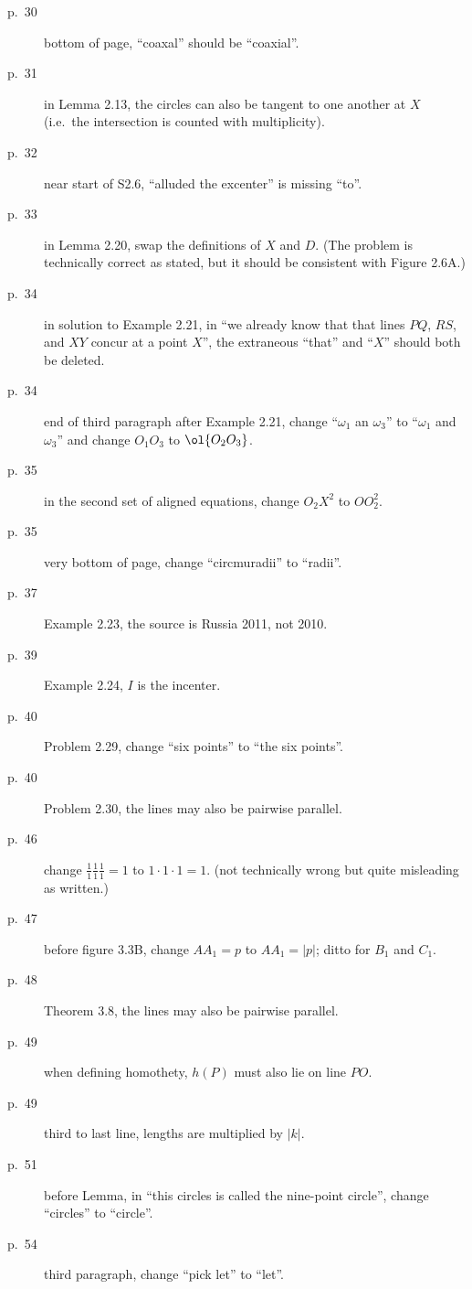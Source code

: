 \documentclass[11pt]{scrartcl}
\begin{document}
\begin{description}
\item[p.\  30] bottom of page, ``coaxal'' should be ``coaxial''.
\item[p.\  31] in Lemma 2.13, the circles can also be tangent
  to one another at $X$ (i.e.\ the intersection is counted with multiplicity).
\item[p.\  32] near start of S2.6, ``alluded the excenter'' is missing ``to''.
\item[p.\  33] in Lemma 2.20, swap the definitions of $X$ and $D$.
  (The problem is technically correct as stated,
  but it should be consistent with Figure 2.6A.)
\item[p.\  34] in solution to Example 2.21, in
  ``we already know that that lines $PQ$, $RS$, and $XY$ concur at a point $X$'',
  the extraneous ``that'' and ``$X$'' should both be deleted.
\item[p.\  34] end of third paragraph after Example 2.21,
  change ``$\omega_1$ an $\omega_3$'' to ``$\omega_1$ and $\omega_3$''
  and change $O_1O_3$ to $\ol{O_2O_3}$.
\item[p.\  35] in the second set of aligned equations,
  change $O_2X^2$ to $OO_2^2$.
\item[p.\  35] very bottom of page, change ``circmuradii'' to ``radii''.
\item[p.\  37] Example 2.23, the source is Russia 2011, not 2010.
\item[p.\  39] Example 2.24, $I$ is the incenter.
\item[p.\  40] Problem 2.29, change ``six points'' to ``the six points''.
\item[p.\  40] Problem 2.30, the lines may also be pairwise parallel.
\item[p.\  46] change $\frac 11 \frac 11 \frac 11 = 1$ to $1 \cdot 1 \cdot 1 = 1$.
  (not technically wrong but quite misleading as written.)
\item[p.\  47] before figure 3.3B, change $AA_1=p$ to $AA_1=|p|$; ditto for $B_1$ and $C_1$.
\item[p.\  48] Theorem 3.8, the lines may also be pairwise parallel.
\item[p.\  49] when defining homothety, $h(P)$ must also lie on line $PO$.
\item[p.\  49] third to last line, lengths are multiplied by $|k|$.
\item[p.\  51] before Lemma, in ``this circles is called the nine-point circle'', change ``circles'' to ``circle''.
\item[p.\  54] third paragraph, change ``pick let'' to ``let''.

\end{description}
\end{document}
